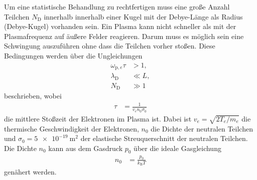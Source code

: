 Um eine statistische Behandlung zu rechtfertigen muss eine gro\ss e Anzahl Teilchen $N_\text{D}$ innerhalb innerhalb einer Kugel mit der Debye-L\"ange als Radius (Debye-Kugel) vorhanden sein.
Ein Plasma kann nicht schneller als mit der Plasmafrequenz auf \"au\ss ere Felder reagieren.
Darum muss es m\"oglich sein eine Schwingung auszuf\"uhren ohne dass die Teilchen vorher sto\ss en.
\cite{stroth11a}
Diese Bedingungen werden \"uber die Ungleichungen
\begin{align}
\omega_{\text{p},e}\tau
&>1,
\label{eq:c1}\\
\lambda_\text{D}
&\ll L,
\label{eq:c2}\\
N_\text{D}
&\gg 1
\label{eq:c3}
\end{align}
beschrieben, wobei
\begin{align}
\tau
    &=\frac{1}{v_en_0\sigma_0}
    \label{eq:tau}
\end{align}
die mittlere Sto\ss zeit der Elektronen im Plasma ist.
Dabei ist $v_e=\sqrt{2T_e/m_e}$ die thermische Geschwindigkeit der Elektronen, $n_0$ die Dichte der neutralen Teilchen und $\sigma_0=\SI{5e-19}{\metre\squared}$ der elastische Streuquerschnitt der neutralen Teilchen.
Die Dichte $n_0$ kann aus dem Gasdruck $p_0$ \"uber die ideale Gasgleichung
\begin{align}
n_0
    &=\frac{p_0}{k_\text{B}T}
    \label{eq:n0}
\end{align}
gen\"ahert werden.
\cite{anleitung2}

